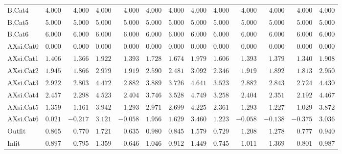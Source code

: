 \documentclass[6pt]{article}
\begin{document}
{\begin{longtable}{lrrrrrrrrrrrr}
B.Cat4&$ 4.000$&$ 4.000$&$ 4.000$&$ 4.000$&$ 4.000$&$ 4.000$&$ 4.000$&$ 4.000$&$ 4.000$&$ 4.000$&$ 4.000$&$ 4.000$\tabularnewline
B.Cat5&$ 5.000$&$ 5.000$&$ 5.000$&$ 5.000$&$ 5.000$&$ 5.000$&$ 5.000$&$ 5.000$&$ 5.000$&$ 5.000$&$ 5.000$&$ 5.000$\tabularnewline
B.Cat6&$ 6.000$&$ 6.000$&$ 6.000$&$ 6.000$&$ 6.000$&$ 6.000$&$ 6.000$&$ 6.000$&$ 6.000$&$ 6.000$&$ 6.000$&$ 6.000$\tabularnewline
AXsi.Cat0&$ 0.000$&$ 0.000$&$ 0.000$&$ 0.000$&$ 0.000$&$ 0.000$&$ 0.000$&$ 0.000$&$ 0.000$&$ 0.000$&$ 0.000$&$ 0.000$\tabularnewline
AXsi.Cat1&$ 1.406$&$ 1.366$&$ 1.922$&$ 1.393$&$ 1.728$&$ 1.674$&$ 1.979$&$ 1.606$&$ 1.393$&$ 1.379$&$ 1.340$&$ 1.908$\tabularnewline
AXsi.Cat2&$ 1.945$&$ 1.866$&$ 2.979$&$ 1.919$&$ 2.590$&$ 2.481$&$ 3.092$&$ 2.346$&$ 1.919$&$ 1.892$&$ 1.813$&$ 2.950$\tabularnewline
AXsi.Cat3&$ 2.922$&$ 2.803$&$ 4.472$&$ 2.882$&$ 3.889$&$ 3.726$&$ 4.641$&$ 3.523$&$ 2.882$&$ 2.843$&$ 2.724$&$ 4.430$\tabularnewline
AXsi.Cat4&$ 2.457$&$ 2.298$&$ 4.523$&$ 2.404$&$ 3.746$&$ 3.528$&$ 4.749$&$ 3.258$&$ 2.404$&$ 2.351$&$ 2.192$&$ 4.467$\tabularnewline
AXsi.Cat5&$ 1.359$&$ 1.161$&$ 3.942$&$ 1.293$&$ 2.971$&$ 2.699$&$ 4.225$&$ 2.361$&$ 1.293$&$ 1.227$&$ 1.029$&$ 3.872$\tabularnewline
AXsi.Cat6&$ 0.021$&$-0.217$&$ 3.121$&$-0.058$&$ 1.956$&$ 1.629$&$ 3.460$&$ 1.223$&$-0.058$&$-0.138$&$-0.375$&$ 3.036$\tabularnewline
Outfit&$ 0.865$&$ 0.770$&$ 1.721$&$ 0.635$&$ 0.980$&$ 0.845$&$ 1.579$&$ 0.729$&$ 1.208$&$ 1.278$&$ 0.777$&$ 0.940$\tabularnewline
Infit&$ 0.897$&$ 0.795$&$ 1.359$&$ 0.646$&$ 1.046$&$ 0.912$&$ 1.449$&$ 0.745$&$ 1.011$&$ 1.369$&$ 0.801$&$ 0.987$\tabularnewline
\hline
\end{longtable}}
\end{document}
